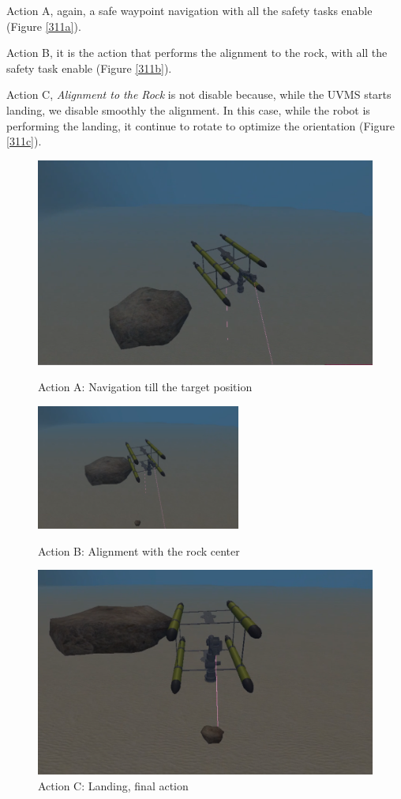 \documentclass{article}
\begin{document}
\begin{description}
	\item Action A, again, a safe waypoint navigation with all the safety tasks enable (Figure \ref{311a}). 
	\item Action B, it is the action that performs the alignment to the rock, with all the safety task enable (Figure \ref{311b}). 
	\item Action C, \textit{Alignment to the Rock} is not disable because, while the UVMS starts landing, we disable smoothly the alignment. In this case, while the robot is performing the landing, it continue to rotate to optimize the orientation (Figure \ref{311c}).
\end{description}



\begin{figure}[htp]
\centering
\includegraphics[width=.6\textwidth]{312_Nav.png}\caption{Action A: Navigation till the target position}\label{311a}
\vspace{5px}
\centering
\includegraphics[width=0.6\textwidth]{312_Alr.png}\caption{Action B: Alignment with the rock center}\label{311b}
\vspace{5px}
\centering
\includegraphics[width=.6\textwidth]{312_Land.png}\caption{Action C: Landing, final action}\label{311c}
\label{fig:missionphase3}
\vspace{5px}
\end{figure}
\clearpage
\end{document}
